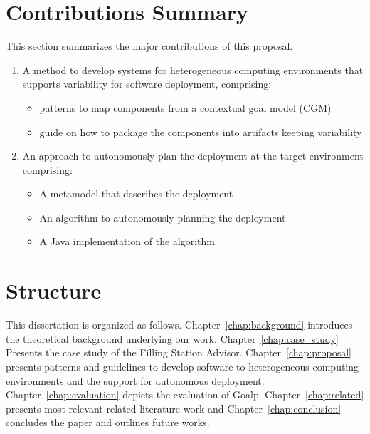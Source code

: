 
\section{Contributions Summary}

This section summarizes the major contributions of this proposal.

\begin{enumerate}

\item A method to develop systems for heterogeneous computing environments that supports variability for software deployment, comprising:
\begin{itemize}
  \item patterns to map components from a contextual goal model (CGM)
  \item guide on how to package the components into artifacts keeping variability
\end{itemize}

\item An approach to autonomously plan the deployment at the target environment comprising:
\begin{itemize}
  \item A metamodel that describes the deployment
  \item An algorithm to autonomously planning the deployment
  \item A Java implementation of the algorithm
\end{itemize}

\end{enumerate}

\section{Structure}

This dissertation is organized as follows. Chapter~\ref{chap:background} introduces the theoretical background underlying our work.  Chapter~\ref{chap:case_study} Presents the case study of the Filling Station Advisor. Chapter~\ref{chap:proposal} presents patterns and guidelines to develop software to heterogeneous computing environments and the support for autonomous deployment.
 Chapter~\ref{chap:evaluation} depicts the evaluation of Goalp.
 Chapter~\ref{chap:related} presents most relevant related literature work and Chapter~\ref{chap:conclusion} concludes the paper and outlines future works.
